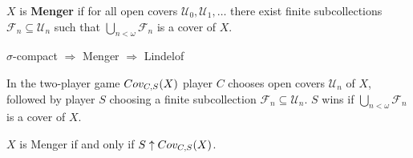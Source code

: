 



  \begin{definition}
    $X$ is \textbf{Menger} if for all open covers $\mathcal{U}_0,\mathcal{U}_1,\dots$ there exist finite subcollections $\mathcal{F}_n \subseteq \mathcal{U}_n$ such that $\bigcup_{n<\omega} \mathcal{F}_n$ is a cover of $X$.
  \end{definition}

  \begin{proposition}
    $\sigma$-compact $\Rightarrow$ Menger $\Rightarrow$ Lindelof
  \end{proposition}

  \begin{definition}
    In the two-player game $Cov_{C,S}(X)$ player $C$ chooses open covers $\mathcal{U}_n$ of $X$, followed by player $S$ choosing a finite subcollection $\mathcal{F}_n\subseteq\mathcal{U}_n$. $S$ wins if $\bigcup_{n<\omega} \mathcal{F}_n$ is a cover of $X$.
  \end{definition}

  \begin{theorem}
    $X$ is Menger if and only if $S \uparrow Cov_{C,S}(X)$.
  \end{theorem}

